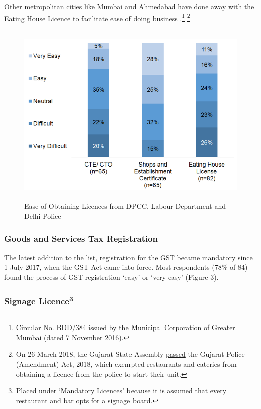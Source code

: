 \documentclass[a4paper, 12pt, twoside]{article}
\begin{document}
                   Other metropolitan cities like Mumbai and Ahmedabad have done away with the Eating House Licence to facilitate ease of doing business \parencite{toi2018ehl}.\footnote{\href{https://bit.ly/2CIOhBU}{Circular No. BDD/384} issued by the Municipal 
Corporation of Greater Mumbai (dated 7 November 2016).} \footnote{On 26 March 2018, the Gujarat State Assembly \href{https://bit.ly/2xktGyu}{passed} the Gujarat Police (Amendment) Act, 2018, which exempted restaurants and eateries from obtaining a licence 
from the police to start their unit.}
                   
 			\begin{figure}[H]
                    		\centering
                    		\includegraphics[height = 3.5in]{Figure2.png}
                    		\captionsetup{justification=centering}\caption[Optional Caption]{Ease of Obtaining Licences from DPCC, Labour Department and Delhi Police}
			\end{figure}

		\subsubsection{Goods and Services Tax Registration}
		The latest addition to the list, registration for the GST became mandatory since 1 July 2017, when the GST Act came into force. Most respondents (78\% of 84) found the process of GST registration ‘easy’ or ‘very easy’ (Figure 3).

		\subsubsection[Signage Licence]{Signage Licence\footnote{Placed under ‘Mandatory Licences’ because it is assumed that every restaurant and bar opts for a signage board.}}
		
\end{document}
